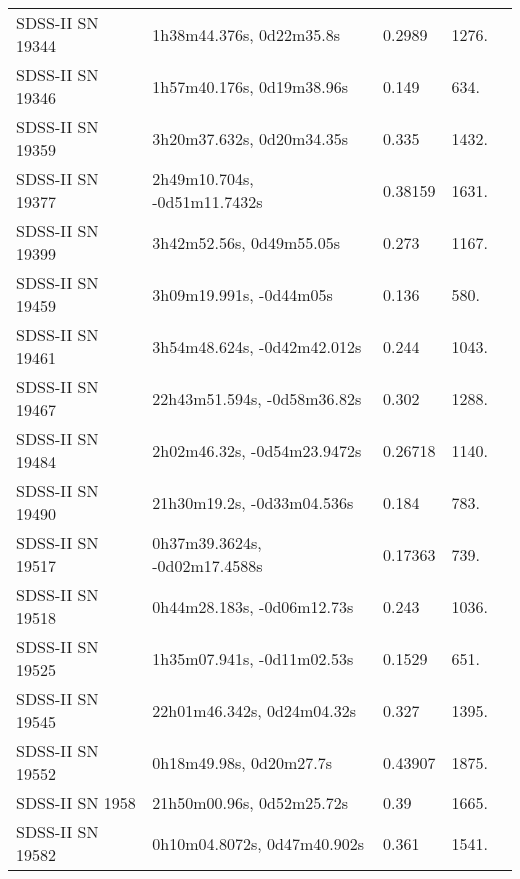 \begin{longtable}{lllll}
 SDSS-II SN 19344 &       1h38m44.376s, 0d22m35.8s &   0.2989 &          1276. &    \citet{2011ApJ...738..162S} \\
 SDSS-II SN 19346 &      1h57m40.176s, 0d19m38.96s &    0.149 &           634. &    \citet{2011ApJ...738..162S} \\
 SDSS-II SN 19359 &      3h20m37.632s, 0d20m34.35s &    0.335 &          1432. &    \citet{2011ApJ...738..162S} \\
 SDSS-II SN 19377 &   2h49m10.704s, -0d51m11.7432s &  0.38159 &          1631. &    \citet{2016SDSSD.C...0000:} \\
 SDSS-II SN 19399 &       3h42m52.56s, 0d49m55.05s &    0.273 &          1167. &    \citet{2011ApJ...738..162S} \\
 SDSS-II SN 19459 &        3h09m19.991s, -0d44m05s &    0.136 &           580. &    \citet{2010ApJ...713.1026D} \\
 SDSS-II SN 19461 &    3h54m48.624s, -0d42m42.012s &    0.244 &          1043. &    \citet{2011ApJ...738..162S} \\
 SDSS-II SN 19467 &    22h43m51.594s, -0d58m36.82s &    0.302 &          1288. &    \citet{2010ApJ...713.1026D} \\
 SDSS-II SN 19484 &    2h02m46.32s, -0d54m23.9472s &  0.26718 &          1140. &    \citet{2016SDSSD.C...0000:} \\
 SDSS-II SN 19490 &     21h30m19.2s, -0d33m04.536s &    0.184 &           783. &    \citet{2011ApJ...738..162S} \\
 SDSS-II SN 19517 &  0h37m39.3624s, -0d02m17.4588s &  0.17363 &           739. &    \citet{2016SDSSD.C...0000:} \\
 SDSS-II SN 19518 &     0h44m28.183s, -0d06m12.73s &    0.243 &          1036. &    \citet{2011ApJ...738..162S} \\
 SDSS-II SN 19525 &     1h35m07.941s, -0d11m02.53s &   0.1529 &           651. &    \citet{2011ApJ...738..162S} \\
 SDSS-II SN 19545 &     22h01m46.342s, 0d24m04.32s &    0.327 &          1395. &    \citet{2011ApJ...738..162S} \\
 SDSS-II SN 19552 &        0h18m49.98s, 0d20m27.7s &  0.43907 &          1875. &    \citet{2016SDSSD.C...0000:} \\
  SDSS-II SN 1958 &      21h50m00.96s, 0d52m25.72s &     0.39 &          1665. &    \citet{2011ApJ...738..162S} \\
 SDSS-II SN 19582 &    0h10m04.8072s, 0d47m40.902s &    0.361 &          1541. &    \citet{2011ApJ...738..162S} \\

\end{longtable}
